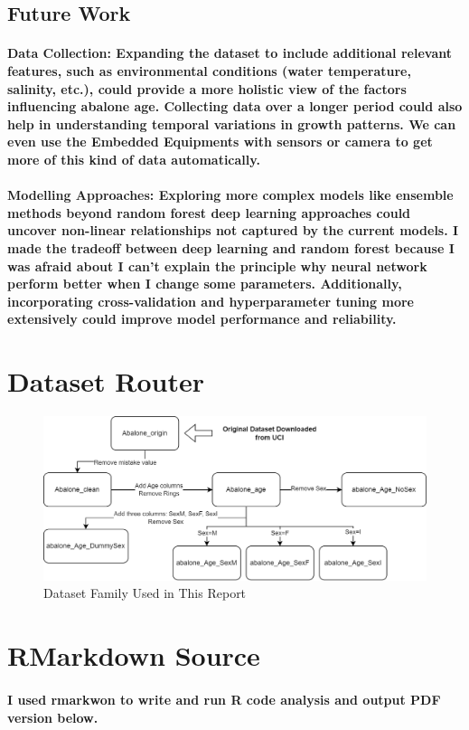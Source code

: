 \documentclass[11pt]{article} %
\begin{document}
\subsection{Future Work}
\paragraph{\textbf{Data Collection}: Expanding the dataset to include additional relevant features, such as environmental conditions (water temperature, salinity, etc.), could provide a more holistic view of the factors influencing abalone age. Collecting data over a longer period could also help in understanding temporal variations in growth patterns. We can even use the Embedded Equipments with sensors or camera to get more of this kind of data automatically.}
\paragraph{\textbf{Modelling Approaches}: Exploring more complex models like ensemble methods beyond random forest deep learning approaches could uncover non-linear relationships not captured by the current models. I made the tradeoff between deep learning and random forest because I was afraid about I can't explain the principle why neural network perform better when I change some parameters. Additionally, incorporating cross-validation and hyperparameter tuning more extensively could improve model performance and reliability.}
% 
% 
% 
% 
% 
% 
% 
% 
% 
% 


% 
% 
\appendix
\section{Dataset Router}
\begin{figure}[H]
    \centering
    \includegraphics[width=\textwidth]{Pic/DatasetDep.png}
    \caption{Dataset Family Used in This Report}
\end{figure}
% 
% 
\section{RMarkdown Source}
\paragraph{I used rmarkwon to write and run R code analysis and output PDF version below.}

% 
% 
% 
% 
\end{document}
